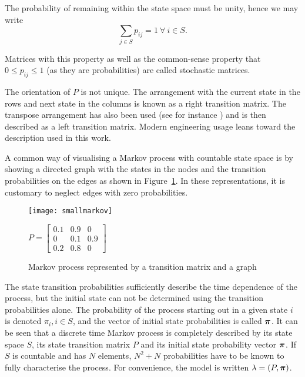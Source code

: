 The probability of remaining within the state space must be unity,
hence we may write 
\begin{equation}
  \label{eq:rowsumone}
  \sum_{j\in S} p_{ij}=1~\forall~i \in S.
\end{equation}

Matrices with this property as well as the common-sense property
that $0 \leq p_{ij} \leq 1$ (as they are probabilities) are called
stochastic matrices.

The orientation of $P$ is not unique. The arrangement with the current
state in the rows and next state in the columns is known as a right
transition matrix. The transpose arrangement has also been used (see
for instance \citet{bhar_hidden_2004}) and is then described as a left
transition matrix. Modern engineering usage leans toward the
description used in this work.

A common way of visualising a Markov process with countable state
space is by showing a directed graph with the states in the nodes and
the transition probabilities on the edges as shown in
Figure~\ref{fig:markovgraph}. In these representations, it is
customary to neglect edges with zero probabilities.

\begin{figure}[htbp]
  \centering
  \begin{minipage}{0.4\textwidth}
    \texttt{[image: smallmarkov]}
  \end{minipage}
  \begin{minipage}{0.4\textwidth}
   $\displaystyle P = \left [ 
      \begin{array}{ccc} 
        0.1 & 0.9 & 0 \\ 
        0 & 0.1 & 0.9 \\ 
        0.2 & 0.8 & 0 
      \end{array} \right ]$
  \end{minipage}
  \caption{Markov process represented by a transition matrix and a graph}
  \label{fig:markovgraph}
\end{figure}

The state transition probabilities sufficiently describe the time
dependence of the process, but the initial state can not be determined
using the transition probabilities alone.  The probability of the
process starting out in a given state $i$ is denoted $\pi_i, i \in S$,
and the vector of initial state probabilities is called
$\boldsymbol{\pi}$. It can be seen that a discrete time Markov process
is completely described by its state space $S$, its state transition matrix
$P$ and its initial state probability vector $\boldsymbol{\pi}$.  If
$S$ is countable and has $N$ elements, $N^2 + N$ probabilities have to
be known to fully characterise the process.  For convenience, the
model is written $\lambda = (P, \boldsymbol{\pi})$.

